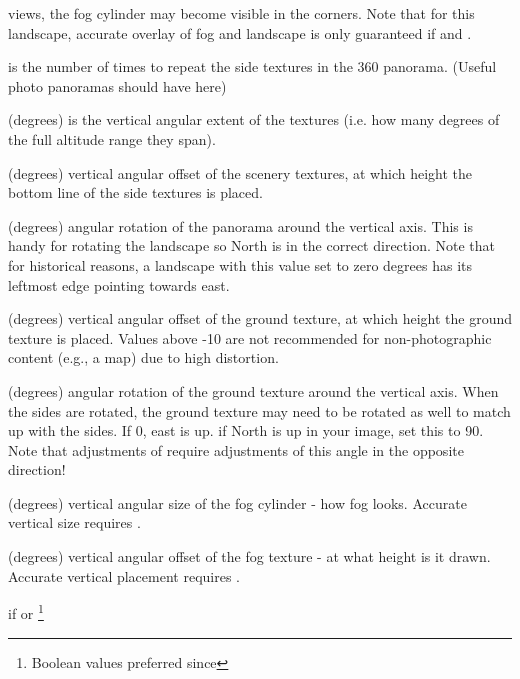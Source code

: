 \begin{description}
{  views, the fog cylinder may become visible in the corners.} Note that for this
  landscape, accurate overlay of fog and landscape is only guaranteed if
   and .
\item[\var{nb\_decor\_repeat}] is the number of times to repeat the
  side textures in the 360 panorama. (Useful photo panoramas should
  have  here)
\item[\var{decor\_alt\_angle}] (degrees) is the vertical angular
  extent of the textures (i.e. how many degrees of the full altitude
  range they span).
\item[\var{decor\_angle\_shift}] (degrees) vertical angular offset of
  the scenery textures, at which height the bottom line of the side
  textures is placed.
\item[\var{decor\_angle\_rotatez}] (degrees) angular rotation of the
  panorama around the vertical axis. This is handy for rotating the
  landscape so North is in the correct direction. Note that for
  historical reasons, a landscape with this value set to zero degrees
  has its leftmost edge pointing towards east.
\item[\var{ground\_angle\_shift}] (degrees) vertical angular offset of
  the ground texture, at which height the ground texture is placed.
  Values above -10 are not recommended for non-photographic content
  (e.g., a map) due to high distortion.
\item[\var{ground\_angle\_rotatez}] (degrees) angular rotation of the
  ground texture around the vertical axis. When the sides are rotated,
  the ground texture may need to be rotated as well to match up with
  the sides. If 0, east is up. if North is up in your image, set this to
  90. Note that adjustments of  require
  adjustments of this angle in the opposite direction!
\item[\var{fog\_alt\_angle}] (degrees) vertical angular size of the
  fog cylinder - how fog looks. Accurate vertical size requires
  .
\item[\var{fog\_angle\_shift}] (degrees) vertical angular offset of
  the fog texture - at what height is it drawn. Accurate vertical
  placement requires .
\item[\var{draw\_ground\_first}] if  or
  \footnote{Boolean values  preferred since
}
\end{description}
